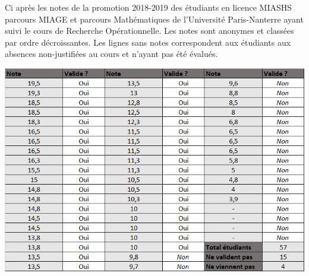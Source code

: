 Ci après les notes de la promotion 2018-2019 des étudiants en licence MIASHS parcours MIAGE et parcours Mathématiques de l'Université Paris-Nanterre ayant suivi le cours de Recherche Opérationnelle. Les notes sont anonymes et classées par ordre décroissantes. Les lignes sans notes correspondent aux étudiants aux absences non-justifiées au cours et n'ayant pas été évalués.

\centerline{\includegraphics[width=\linewidth]{Images/Notes_RO_2018-2019.png}}

